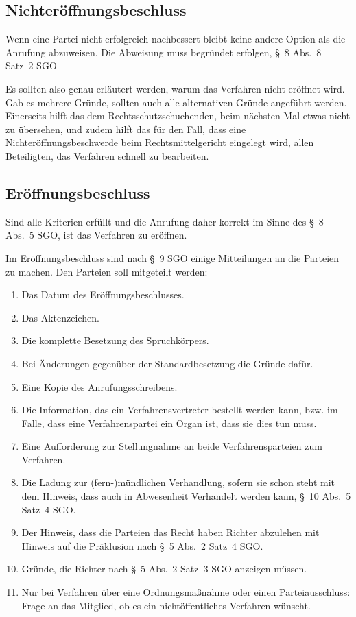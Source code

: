 \subsection{Nichteröffnungsbeschluss}
\label{Anrufung:Beschluss:Nichteroeffnung}
Wenn eine Partei nicht erfolgreich nachbessert bleibt keine andere Option als die Anrufung abzuweisen.
Die Abweisung muss begründet erfolgen, \S~8 Abs.~8 Satz~2 SGO

Es sollten also genau erläutert werden, warum das Verfahren nicht eröffnet wird.
Gab es mehrere Gründe, sollten auch alle alternativen Gründe angeführt werden.
Einerseits hilft das dem Rechtsschutzschuchenden, beim nächsten Mal etwas nicht zu übersehen, und zudem hilft das für den Fall, dass eine Nichteröffnungsbeschwerde beim Rechtsmittelgericht eingelegt wird, allen Beteiligten, das Verfahren schnell zu bearbeiten.

\subsection{Eröffnungsbeschluss}
\label{Anrufung:Beschluss:Eroeffnung}
Sind alle Kriterien erfüllt und die Anrufung daher korrekt im Sinne des \S~8 Abs.~5 SGO, ist das Verfahren zu eröffnen.

Im Eröffnungsbeschluss sind nach \S~9 SGO einige Mitteilungen an die Parteien zu machen.
Den Parteien soll mitgeteilt werden:
\begin{enumerate}
\item Das Datum des Eröffnungsbeschlusses.
\item Das Aktenzeichen.
\item Die komplette Besetzung des Spruchkörpers.
\item Bei Änderungen gegenüber der Standardbesetzung die Gründe dafür.
\item Eine Kopie des Anrufungsschreibens.
\item Die Information, das ein Verfahrensvertreter bestellt werden kann, bzw. im Falle, dass eine Verfahrenspartei ein Organ ist, dass sie dies tun muss.
\item Eine Aufforderung zur Stellungnahme an beide Verfahrensparteien zum Verfahren.
\item Die Ladung zur (fern-)mündlichen Verhandlung, sofern sie schon steht mit dem Hinweis, dass auch in Abwesenheit Verhandelt werden kann, \S~10 Abs.~5 Satz~4 SGO.
\item Der Hinweis, dass die Parteien das Recht haben Richter abzulehen mit Hinweis auf die Präklusion nach \S~5 Abs.~2 Satz~4 SGO.
\item Gründe, die Richter nach \S~5 Abs.~2 Satz~3 SGO anzeigen müssen.
\item Nur bei Verfahren über eine Ordnungsmaßnahme oder einen Parteiausschluss: Frage an das Mitglied, ob es ein nichtöffentliches Verfahren wünscht.
\end{enumerate}


